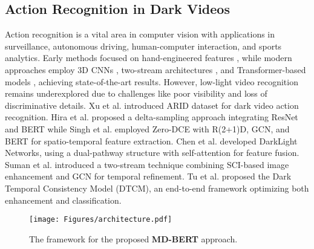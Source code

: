 
\subsection{Action Recognition in Dark Videos}



Action recognition is a vital area in computer vision with applications in surveillance, autonomous driving, human-computer interaction, and sports analytics. Early methods focused on hand-engineered features \cite{laptev2008learning}, while modern approaches employ 3D CNNs \cite{tran2015learning}, two-stream architectures \cite{simonyan2014two}, and Transformer-based models \cite{dosovitskiy2020image}, achieving state-of-the-art results. However, low-light video recognition remains underexplored due to challenges like poor visibility and loss of discriminative details. Xu et al. \cite{xu2021arid} introduced ARID dataset for dark video action recognition. Hira et al. \cite{hira2021delta} proposed a delta-sampling approach integrating ResNet and BERT while Singh et al. \cite{singh2022action}  employed Zero-DCE with R(2+1)D, GCN, and BERT for spatio-temporal feature extraction. Chen et al. \cite{chen2021darklight} developed DarkLight Networks, using a dual-pathway structure with self-attention for feature fusion. Suman et al. \cite{suman2023two} introduced a two-stream technique combining SCI-based image enhancement and GCN for temporal refinement. Tu et al. \cite{tu2023dtcm} proposed the Dark Temporal Consistency Model (DTCM), an end-to-end framework optimizing both enhancement and classification. 



\begin{figure*}[ht]
    \centering
    \texttt{[image: Figures/architecture.pdf]}
    \caption{The framework for the proposed \textbf{MD-BERT} approach.}
    \label{fig:arc-figure}
\end{figure*}